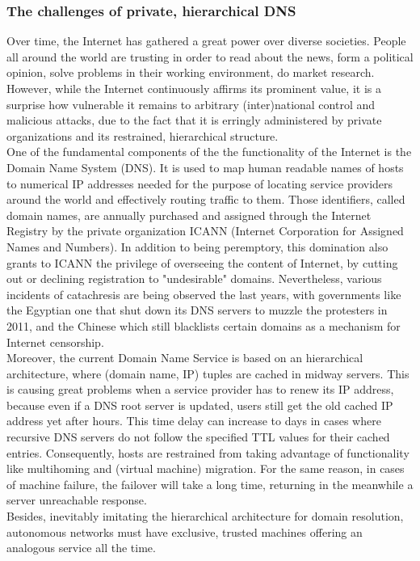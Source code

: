 \subsubsection{The challenges of private, hierarchical DNS}
Over time, the Internet has gathered a great power over diverse societies.
People all around the world are trusting in order to read about the news, form a political opinion, solve problems in their working environment, do market research.
However, while the Internet continuously affirms its prominent value, it is a surprise how vulnerable it remains to arbitrary (inter)national control and malicious attacks, due to the fact that it is erringly administered by private organizations and its restrained, hierarchical structure. \\
\indent One of the fundamental components of the the functionality of the Internet is the Domain Name System (DNS).
It is used to map human readable names of hosts to numerical IP addresses needed for the purpose of locating service providers around the world and effectively routing traffic to them.
Those identifiers, called domain names, are annually purchased and assigned through the Internet Registry by the private organization ICANN (Internet Corporation for Assigned Names and Numbers).
In addition to being peremptory, this domination also grants to ICANN the privilege of overseeing the content of Internet, by cutting out or declining registration to "undesirable" domains.
Nevertheless, various incidents of catachresis are being observed the last years, with governments like the Egyptian one that shut down its DNS servers to muzzle the protesters in 2011, and the Chinese which still blacklists certain domains as a mechanism for Internet censorship.\\
\indent Moreover, the current Domain Name Service is based on an hierarchical architecture, where (domain name, IP) tuples are cached in midway servers.
This is causing great problems when a service provider has to renew its IP address, because even if a DNS root server is updated, users still get the old cached IP address yet after hours.
This time delay can increase to days in cases where recursive DNS servers do not follow the specified TTL values for their cached entries.
Consequently, hosts are restrained from taking advantage of functionality like multihoming and (virtual machine) migration.
For the same reason, in cases of machine failure, the failover will take a long time, returning in the meanwhile a server unreachable response. \\
\indent Besides, inevitably imitating the hierarchical architecture for domain resolution, autonomous networks must have exclusive, trusted machines offering an analogous service all the time.
